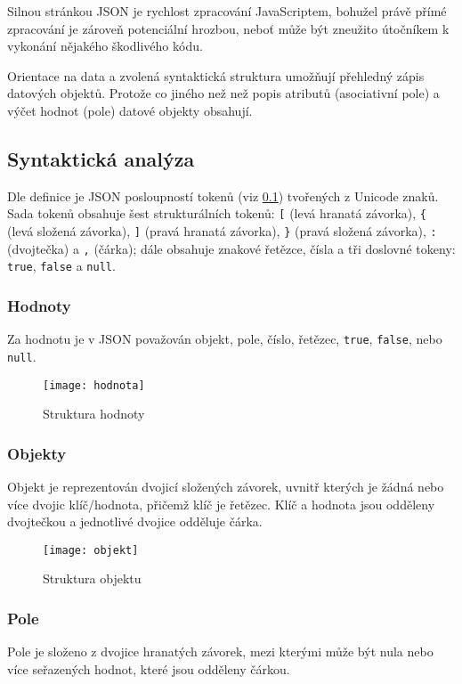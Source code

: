 Silnou stránkou JSON je rychlost zpracování JavaScriptem, bohužel právě přímé zpracování je zároveň potenciální hrozbou, neboť může být zneužito útočníkem k vykonání nějakého škodlivého kódu.

Orientace na data a zvolená syntaktická struktura umožňují přehledný zápis datových objektů. Protože co jiného než než popis atributů (asociativní pole) a výčet hodnot (pole) datové objekty obsahují.

\subsection{Syntaktická analýza}
\label{syntaxeJson}
Dle definice \cite{json} je JSON posloupností tokenů (viz \ref{syntaxeJson}) tvořených z Unicode znaků. Sada tokenů obsahuje šest strukturálních tokenů: \texttt{[} (levá hranatá závorka), \texttt{\{} (levá složená závorka), \texttt{]} (pravá hranatá závorka), \texttt{\}} (pravá složená závorka), \texttt{:} (dvojtečka) a \texttt{,} (čárka); dále obsahuje znakové řetězce, čísla a tři doslovné tokeny: \texttt{true}, \texttt{false} a \texttt{null}.

\subsubsection{Hodnoty}
Za hodnotu je v JSON považován objekt, pole, číslo, řetězec, \texttt{true}, \texttt{false}, nebo \texttt{null}.

\begin{figure}[!htb]
\centering
\texttt{[image: hodnota]}
\caption{Struktura hodnoty}
\label{hodnota}
\end{figure}

\subsubsection{Objekty}
Objekt je reprezentován dvojicí složených závorek, uvnitř kterých je žádná nebo více dvojic klíč/hodnota, přičemž klíč je řetězec. Klíč a hodnota jsou odděleny dvojtečkou a jednotlivé dvojice odděluje čárka.

\begin{figure}[!htb]
\centering
\texttt{[image: objekt]}
\caption{Struktura objektu}
\label{objekt}
\end{figure}

\subsubsection{Pole}
Pole je složeno z dvojice hranatých závorek, mezi kterými může být nula nebo více seřazených hodnot, které jsou odděleny čárkou.


